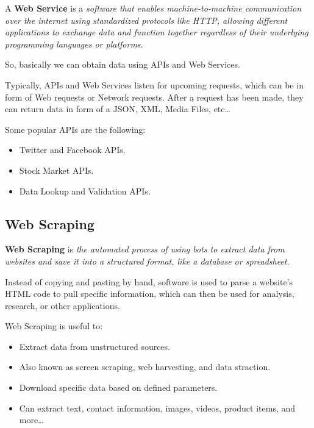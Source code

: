 \documentclass[../../ibm_data_analysis.tex]{subfiles}
\begin{document}
    \begin{mydef}
        A \textbf{Web Service} is a \textit{software that enables machine-to-machine communication over the internet using standardized protocols like HTTP, allowing different applications to exchange data and function together regardless of their underlying programming languages or platforms}. 
    \end{mydef}

    So, basically we can obtain data using APIs and Web Services.

    \begin{obs}
        Typically, APIs and Web Services listen for upcoming requests, which can be in form of Web requests or Network requests. After a request has been made, they can return data in form of a JSON, XML, Media Files, etc\dots
    \end{obs}

    \begin{exa}
        Some popular APIs are the following:
        \begin{itemize}
            \item Twitter and Facebook APIs.
            \item Stock Market APIs.
            \item Data Lookup and Validation APIs.
        \end{itemize}
    \end{exa}

    \subsection{Web Scraping}

    \begin{mydef}
        \textbf{Web Scraping} is \textit{the automated process of using bots to extract data from websites and save it into a structured format, like a database or spreadsheet}.
    \end{mydef}
    
    Instead of copying and pasting by hand, software is used to parse a website's HTML code to pull specific information, which can then be used for analysis, research, or other applications.

    \begin{obs}
        Web Scraping is useful to:
        \begin{itemize}
            \item Extract data from unstructured sources.
            \item Also known as screen scraping, web harvesting, and data straction.
            \item Download specific data based on defined parameters.
            \item Can extract text, contact information, images, videos, product items, and more\dots
        \end{itemize}
    \end{obs}
\end{document}
